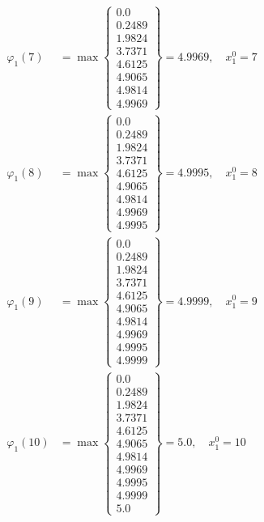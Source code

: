 \documentclass{article}
\begin{document}
\begin{align*}
\varphi_{1}(7) &= \max \left\{ \begin{array}{c}
0.0 \\
 0.2489 \\
 1.9824 \\
 3.7371 \\
 4.6125 \\
 4.9065 \\
 4.9814 \\
 4.9969
\end{array} \right\}=4.9969, \quad x_{1}^0=7\\
  
\varphi_{1}(8) &= \max \left\{ \begin{array}{c}
0.0 \\
 0.2489 \\
 1.9824 \\
 3.7371 \\
 4.6125 \\
 4.9065 \\
 4.9814 \\
 4.9969 \\
 4.9995
\end{array} \right\}=4.9995, \quad x_{1}^0=8\\
  
\varphi_{1}(9) &= \max \left\{ \begin{array}{c}
0.0 \\
 0.2489 \\
 1.9824 \\
 3.7371 \\
 4.6125 \\
 4.9065 \\
 4.9814 \\
 4.9969 \\
 4.9995 \\
 4.9999
\end{array} \right\}=4.9999, \quad x_{1}^0=9\\
  
\varphi_{1}(10) &= \max \left\{ \begin{array}{c}
0.0 \\
 0.2489 \\
 1.9824 \\
 3.7371 \\
 4.6125 \\
 4.9065 \\
 4.9814 \\
 4.9969 \\
 4.9995 \\
 4.9999 \\
 5.0
\end{array} \right\}=5.0, \quad x_{1}^0=10\\
  

\end{align*}
\end{document}
